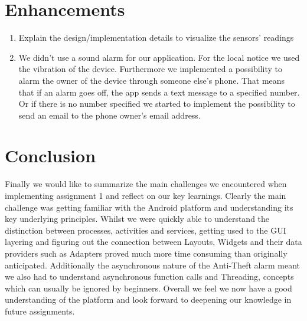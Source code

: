 \documentclass{report}
\begin{document}
\section{Enhancements}

\begin{enumerate}
  \item Explain the design/implementation details to visualize the sensors' readings
  \item We didn't use a sound alarm for our application. For the local notice we used the vibration of the device. Furthermore we implemented a possibility to alarm the owner of the device through someone else's phone. That means that if an alarm goes off, the app sends a text message to a specified number. Or if there is no number specified we started to implement the possibility to send an email to the phone owner's email address. 
\end{enumerate}

\section{Conclusion}

Finally we would like to summarize the main challenges we encountered when implementing assignment 1 and reflect on our key learnings. Clearly the main challenge was getting familiar with the Android platform and understanding its key underlying principles. Whilst we were quickly able to understand the distinction between processes, activities and services, getting used to the GUI layering and figuring out the connection between Layouts, Widgets and their data providers such as Adapters proved much more time consuming than originally anticipated. Additionally the asynchronous nature of the Anti-Theft alarm meant we also had to understand asynchronous function calls and Threading, concepts which can usually be ignored by beginners. Overall we feel we now have a good understanding of the platform and look forward to deepening our knowledge in future assignments.



\end{document}
